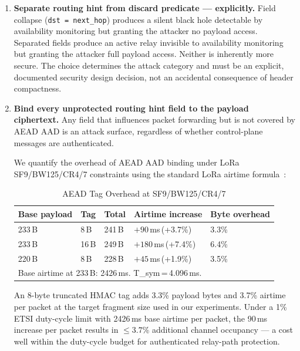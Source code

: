 \documentclass[journal]{IEEEtran}
\begin{document}
\begin{enumerate}
  \item \textbf{Separate routing hint from discard predicate --- explicitly.}
    Field collapse (\texttt{dst = next\_hop}) produces a silent black hole
    detectable by availability monitoring but granting the attacker no payload
    access. Separated fields produce an active relay invisible to availability
    monitoring but granting the attacker full payload access. Neither is
    inherently more secure. The choice determines the attack category and must
    be an explicit, documented security design decision, not an accidental
    consequence of header compactness.

  \item \textbf{Bind every unprotected routing hint field to the
    payload ciphertext.}
    Any field that influences packet forwarding but is not covered by AEAD
    AAD is an attack surface, regardless of whether control-plane messages
    are authenticated.

    We quantify the overhead of AEAD AAD binding under LoRa SF9/BW125/CR4/7
    constraints using the standard LoRa airtime formula~\cite{lora-calc}:

    \begin{table}[h]
      \centering
      \caption{AEAD Tag Overhead at SF9/BW125/CR4/7}
      \label{tab:aead-overhead}
      \begin{tabular}{lllll}
        \toprule
        Base payload & Tag & Total & Airtime increase & Byte overhead \\
        \midrule
        233\,B & 8\,B  & 241\,B & $+90$\,ms\,(+3.7\%) & 3.3\% \\
        233\,B & 16\,B & 249\,B & $+180$\,ms\,(+7.4\%) & 6.4\% \\
        220\,B & 8\,B  & 228\,B & $+45$\,ms\,(+1.9\%) & 3.5\% \\
        \bottomrule
        \multicolumn{5}{l}{\footnotesize{Base airtime at 233\,B: 2426\,ms. T\_sym\,=\,4.096\,ms.}}
      \end{tabular}
    \end{table}

    An 8-byte truncated HMAC tag adds 3.3\% payload bytes and 3.7\% airtime
    per packet at the target fragment size used in our experiments. Under a
    1\% ETSI duty-cycle limit with 2426\,ms base airtime per packet, the
    90\,ms increase per packet results in $\leq 3.7$\% additional channel
    occupancy --- a cost well within the duty-cycle budget for authenticated
    relay-path protection.
\end{enumerate}
\end{document}
